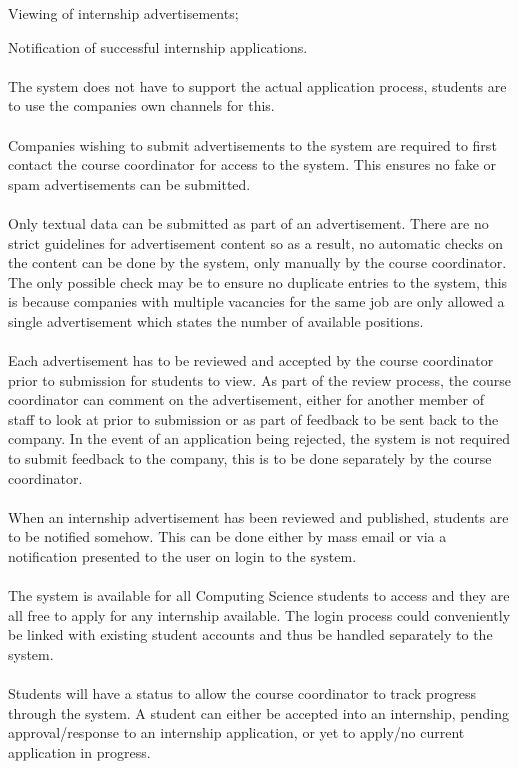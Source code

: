\documentclass{l3deliverable}
\begin{document}
Viewing of internship advertisements;

Notification of successful internship applications.
\\\\
The system does not have to support the actual application process, students
are to use the companies own channels for this.
\\\\
Companies wishing to submit advertisements to the system are required to first
contact the course coordinator for access to the system. This ensures no fake
or spam advertisements can be submitted.
\\\\
Only textual data can be submitted as part of an advertisement. There are no
strict guidelines for advertisement content so as a result, no automatic checks
on the content can be done by the system, only manually by the course
coordinator. The only possible check may be to ensure no duplicate entries
to the system, this is because companies with multiple vacancies for the same
job are only allowed a single advertisement which states the number of
available positions.
\\\\
Each advertisement has to be reviewed and accepted by the course coordinator
prior to submission for students to view. As part of the review process, the
course coordinator can comment on the advertisement, either for another member
of staff to look at prior to submission or as part of feedback to be sent back
to the company. In the event of an application being rejected, the system is
not required to submit feedback to the company, this is to be done separately
by the course coordinator.
\\\\
When an internship advertisement has been reviewed and published, students 
are to be notified somehow. This can be done either by mass email or via a 
notification presented to the user on login to the system.
\\\\
The system is available for all Computing Science students to access and 
they are all free to apply for any internship available. The login process could
conveniently be linked with existing student accounts and thus be handled separately
to the system.
\\\\
Students will have a status to allow the course coordinator to track progress
through the system. A student can either be accepted into an internship, pending
approval/response to an internship application, or yet to apply/no current 
application in progress.
\end{document}

